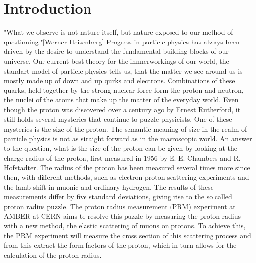 \chapter{Introduction} \label{chap:introduction}
"What we observe is not nature itself, but nature exposed to our method of questioning."[Werner Heisenberg]\autocite{Heisenberg1958}
\newline
Progress in particle physics has always been driven by the desire to understand the fundamental building blocks of our universe.
\newline Our current best theory for the innnerworkings of our world,
the standart model of particle physics tells us, that the matter we see around us is mostly made up of down and up qurks and electrons.
Combinations of these quarks, held together by the strong nuclear force form the proton and neutron, the nuclei of the atoms that make up the matter of the everyday world.\autocite{Workman:2836514}
Even though the proton was discovered over a century ago by Ernest Rutherford\autocite{discoveryProton}, it still holds several mysteries that continue to puzzle physicists.
One of these mysteries is the size of the proton.
\newline
The semantic meaning of size in the realm of particle physics is not as straight forward as in the macroscopic world. An answer to the question,
what is the size of the proton can be given by looking at the charge radius of the proton, first measured in 1956 by E. E. Chambers and R. Hofstadter.\autocite{Hofstadter1956}
\newline
The radius of the proton has been measured several times more since then, with different methods, such as electron-proton scattering experiments and the lamb shift in muonic and ordinary hydrogen.
The results of these measurements differ by five standard deviations, giving rise to the so called proton radius puzzle.\autocite{ProposalAmber}
\newline
The proton radius measurement (PRM) experiment at AMBER at CERN aims to resolve this puzzle by measuring the proton radius with a new method,
 the elastic scattering of muons on protons.
\newline
To achieve this, the PRM experiment will measure the cross section of this scattering process and from this extract the form factors of the proton, which in turn allows for the calculation of the proton radius.
